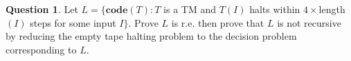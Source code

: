 \documentclass{article}
\theoremstyle{definition}
\newtheorem{Q}{Question}
\newcommand{\co}{\mathbf{code}}
\begin{document}
\begin{Q}
Let $L=\{\co(T): T$ is a TM and $T(I)$ halts within $4\times$length$(I)$ steps for some input $I\}$. Prove $L$ is r.e. then prove that $L$ is not recursive by reducing the empty tape halting problem to the decision problem corresponding to $L$. 
\end{Q}
\begin{comment}
\textbf{Solution} \\
To show that $L$ is r.e. we use the fact that the set $\Sigma^*$ is r.e. and assume we can generate all strings in order. We use the following algorithm:
\begin{enumerate}
\item Generate the first string $I$.
\item Calculate the length of $I$.
\item Simulate $T(I)$ while tracking the number of simulated steps.
\item If $T(I)$ halts within $4\times$length$(I)$ steps then accept.
\item If $T(I)$ does not halt within $4\times$length$(I)$ steps then generate next $I$ and go to step 2. 
\end{enumerate}
An instance of ETHP is a Turing machine $T$. Given $T$, or, more precisely, given $\co(T)$, we want an algorithm that constructs a Turing machine $T'$ (more precisely, $\co(T')$), such that $T(\epsilon)$ halts if and only if $T'(J)$ halts within $4\times$length$(J)$ steps for some $J\in \Sigma^*$. 

Define $T'$ to be the machine that acts as follows:
\begin{enumerate}
\item Erase the input.
\item Move tape head back to first space. 
\item Do what $T$ would do.
\end{enumerate}
Then: 
\begin{align*}
T\text{ is a yes instance of ETHP} \implies& T(\epsilon)\text{ halts} \\ 
\implies& \text{There is $n$ such that $T(\epsilon)$ halts in $n$ steps}\\
\implies& T'(J)\text{ halts within $4\times$length$(J)$ when length$(J)=n+2$}\\
\implies& T' \text{ is a yes instance of }D_L.
\end{align*}
Note the importance of the number 4. $T'$ operates by first erasing the input $J$. This takes $2|J|+1$ steps (2 steps for each character of $J$, and an extra step for the tape head to move onto the first blank). $T'$ then moves the tape head back to the start space. This takes $|J|+1$ steps. Since by assumption $T(\epsilon)$ halts in $n$ steps, we know $T'(J)$ halts within $2(n+2)+1 + (n+2)+1 + n = 4n+8=4(n+2)=4|J|$ steps. 

Conversely, if $T(\epsilon)$ does not halt then $T'(J)$ does not halt for any $J$, and so $T'$ is trivially a no instance of $D_L$.    
\end{comment}
\end{document}
